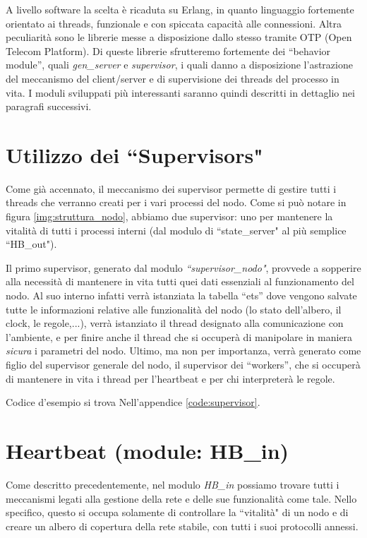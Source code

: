\documentclass[italian]{memoir}
\begin{document}
A livello software la scelta è ricaduta su Erlang, in quanto linguaggio fortemente orientato ai threads, funzionale e con spiccata capacità alle connessioni. Altra peculiarità sono le librerie messe a disposizione dallo stesso tramite OTP (Open Telecom Platform). Di queste librerie sfrutteremo fortemente dei ``behavior module'', quali \textit{gen\_server} e \textit{supervisor}, i quali danno a disposizione l'astrazione del meccanismo del client/server e di supervisione dei threads del processo in vita. I moduli sviluppati più interessanti saranno quindi descritti in dettaglio nei paragrafi successivi.

\section{Utilizzo dei ``Supervisors"}
Come già accennato, il meccanismo dei supervisor permette di gestire tutti i threads che verranno creati per i vari processi del nodo. Come si può notare in figura \ref{img:struttura_nodo}, abbiamo due supervisor: uno per mantenere la vitalità di tutti i processi interni (dal modulo di ``state\_server" al più semplice ``HB\_out").

Il primo supervisor, generato dal modulo \textit{``supervisor\_nodo"}, provvede a sopperire alla necessità di mantenere in vita tutti quei dati essenziali al funzionamento del nodo. Al suo interno infatti verrà istanziata la tabella ``ets'' dove vengono salvate tutte le informazioni relative alle funzionalità del nodo (lo stato dell'albero, il clock, le regole,...), verrà istanziato il thread designato alla comunicazione con l'ambiente, e per finire anche il thread che si occuperà di manipolare in maniera \textit{sicura} i parametri del nodo. Ultimo, ma non per importanza, verrà generato come figlio del supervisor generale del nodo, il supervisor dei ``workers'', che si occuperà di mantenere in vita i thread per l'heartbeat e per chi interpreterà le regole.

Codice d'esempio si trova Nell'appendice \ref{code:supervisor}.

\section{Heartbeat (module: HB\_in)}\label{impl:hbin}
Come descritto precedentemente, nel modulo \textit{HB\_in} possiamo trovare tutti i meccanismi legati alla gestione della rete e delle sue funzionalità come tale. Nello specifico, questo si occupa solamente di controllare la ``vitalità" di un nodo e di creare un albero di copertura della rete stabile, con tutti i suoi protocolli annessi.
\end{document}
